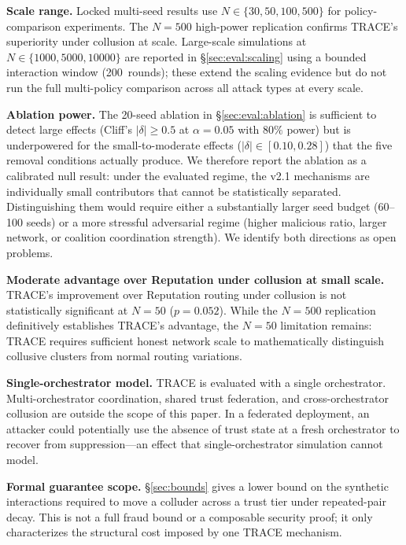 \documentclass[sigconf,nonacm,10pt]{acmart}
\begin{document}
\noindent\textbf{Scale range.}
Locked multi-seed results use $N \in \{30, 50, 100, 500\}$ for
policy-comparison experiments. The $N{=}500$ high-power replication
confirms TRACE's superiority under collusion at scale. Large-scale
simulations at $N \in \{1000, 5000, 10000\}$ are reported in
\S\ref{sec:eval:scaling} using a bounded interaction window (200~rounds);
these extend the scaling evidence but do not run the full multi-policy
comparison across all attack types at every scale.

\noindent\textbf{Ablation power.}
The 20-seed ablation in \S\ref{sec:eval:ablation} is sufficient
to detect large effects (Cliff's $|\delta| \geq 0.5$ at
$\alpha = 0.05$ with $80\%$ power) but is underpowered for the
small-to-moderate effects ($|\delta| \in [0.10, 0.28]$) that the
five removal conditions actually produce. We therefore report the
ablation as a calibrated null result: under the evaluated regime,
the v2.1 mechanisms are individually small contributors that
cannot be statistically separated. Distinguishing them would
require either a substantially larger seed budget (60--100
seeds) or a more stressful adversarial regime (higher malicious
ratio, larger network, or coalition coordination strength). We
identify both directions as open problems.

\noindent\textbf{Moderate advantage over Reputation under
  collusion at small scale.}
TRACE's improvement over Reputation routing under collusion is
not statistically significant at $N{=}50$ ($p = 0.052$). While the
$N{=}500$ replication definitively establishes TRACE's advantage, the
$N{=}50$ limitation remains: TRACE requires sufficient honest network
scale to mathematically distinguish collusive clusters from normal
routing variations.

\noindent\textbf{Single-orchestrator model.}
TRACE is evaluated with a single orchestrator. Multi-orchestrator
coordination, shared trust federation, and cross-orchestrator
collusion are outside the scope of this paper. In a federated
deployment, an attacker could potentially use the absence of
trust state at a fresh orchestrator to recover from
suppression---an effect that single-orchestrator simulation
cannot model.

\noindent\textbf{Formal guarantee scope.}
\S\ref{sec:bounds} gives a lower bound on the synthetic interactions
required to move a colluder across a trust tier under repeated-pair
decay. This is not a full fraud bound or a composable security proof; it
only characterizes the structural cost imposed by one TRACE mechanism.
\end{document}

